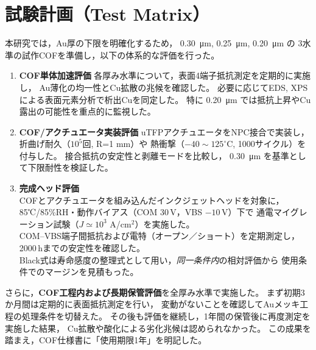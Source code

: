 \documentclass[conference]{IEEEtran}
\begin{document}
\section{試験計画（Test Matrix）}
本研究では，Au厚の下限を明確化するため，
\SI{0.30}{\micro\meter}, \SI{0.25}{\micro\meter}, \SI{0.20}{\micro\meter} の
3水準の試作COFを準備し，以下の体系的な評価を行った。

\begin{enumerate}
  \item \textbf{COF単体加速評価}  
        各厚み水準について，表面4端子抵抗測定を定期的に実施し，
        Au薄化の均一性とCu拡散の兆候を確認した。  
        必要に応じてEDS, XPSによる表面元素分析で析出Cuを同定した。  
        特に \SI{0.20}{\micro\meter} では抵抗上昇やCu露出の可能性を重点的に監視した。
  \item \textbf{COF/アクチュエータ実装評価}  
        uTFPアクチュエータをNPC接合で実装し，折曲げ耐久（$10^5$回, R=1 mm）や
        熱衝撃（$-40\sim125^\circ$C, 1000サイクル）を付与した。  
        接合抵抗の安定性と剥離モードを比較し，
        \SI{0.30}{\micro\meter} を基準として下限耐性を検証した。
  \item \textbf{完成ヘッド評価} \\
        COFとアクチュエータを組み込んだインクジェットヘッドを対象に，
        85℃/85\%RH・動作バイアス（COM 30\,V，VBS $-10$\,V）下で
        通電マイグレーション試験（$J \simeq 10^{3}$ A/cm$^{2}$）を実施した。\\
        COM--VBS端子間抵抗および電特（オープン／ショート）を定期測定し，
        2000\,hまでの安定性を確認した。\\
        Black式は寿命感度の整理式として用い，\emph{同一条件内}の相対評価から
        使用条件でのマージンを見積もった。
\end{enumerate}

さらに，\textbf{COF工程内および長期保管評価}を全厚み水準で実施した。  
まず初期3か月間は定期的に表面抵抗測定を行い，
変動がないことを確認してAuメッキ工程の処理条件を切替えた。  
その後も評価を継続し，1年間の保管後に再度測定を実施した結果，
Cu拡散や酸化による劣化兆候は認められなかった。  
この成果を踏まえ，COF仕様書に「使用期限1年」を明記した。
\end{document}
